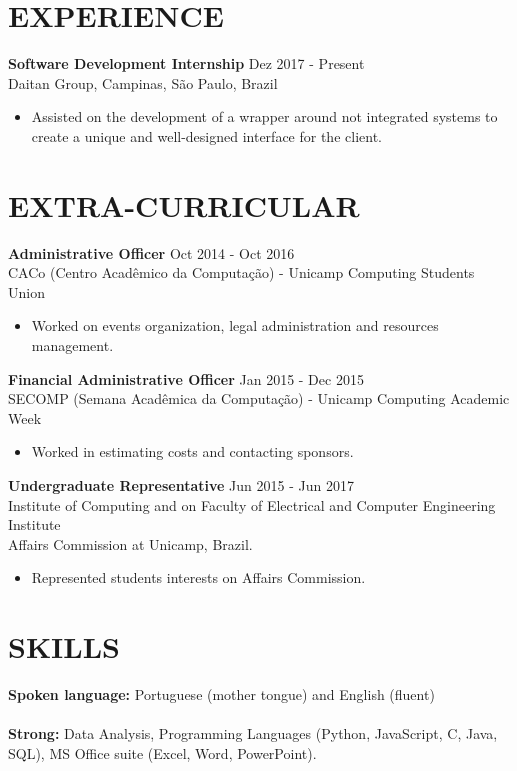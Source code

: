 \documentclass[margin, 10pt]{res} %
\begin{document}
\begin{resume}
\section{EXPERIENCE}
{\bf Software Development Internship} \hfill Dez 2017 - Present \\
Daitan Group, Campinas, São Paulo, Brazil
\begin{itemize}
\item Assisted on the development of a wrapper around not integrated systems to create a unique and well-designed interface for the client. \\
\end{itemize}

\section{EXTRA-CURRICULAR}
{\bf Administrative Officer} \hfill Oct 2014 - Oct 2016 \\
CACo (Centro Acadêmico da Computação) - Unicamp Computing Students Union
\begin{itemize} \itemsep -1pt %
\item Worked on events organization, legal administration and resources management.
\end{itemize}

{\bf Financial Administrative Officer} \hfill Jan 2015 - Dec 2015 \\
SECOMP (Semana Acadêmica da Computação) - Unicamp Computing Academic Week
\begin{itemize} \itemsep -1pt %
\item Worked in estimating costs and contacting sponsors.
\end{itemize}

{\bf Undergraduate Representative} \hfill Jun 2015 - Jun 2017 \\
Institute of Computing and on Faculty of Electrical and Computer Engineering Institute \\ Affairs Commission at Unicamp, Brazil.
\begin{itemize} \itemsep -1pt %
\item Represented students interests on Affairs Commission.
\end{itemize}

\section{SKILLS}
{\bf Spoken language:} Portuguese (mother tongue) and English (fluent) \\ \\
{\bf Strong:} Data Analysis, Programming Languages (Python, JavaScript, C, Java, SQL), MS Office suite (Excel, Word, PowerPoint).

\end{resume}
\end{document}
